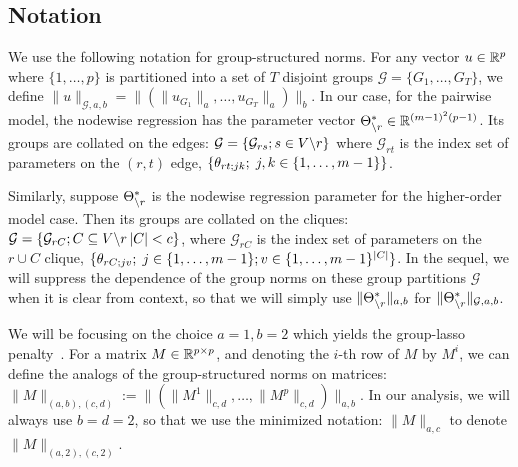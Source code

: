 \subsection{Notation}

We use the following notation for group-structured norms. For any vector $u \in \mathbb{R}^p$ where $\{1,\hdots,p\}$ is partitioned into a set of $T$ disjoint groups $\mathcal{G} = \{G_1,\hdots,G_T\}$, we define $\|u\|_{\mathcal{G},a,b} = \|(\|u_{G_1}\|_{a},\hdots, u_{G_T}\|_{a})\|_b$. In our case, for the pairwise model, the nodewise regression has the parameter vector $\Theta^*_{\backslash r} \in \mathbb{R}^{(m-1)^2(p-1)}$. Its groups are collated on the edges:  $\mathcal{G} = \{ \mathcal{G}_{rs}; s \in  V \backslash r\}$ where $\mathcal{G}_{rt}$ is the index set of parameters on the  $(r,t)$ edge, $\{\theta_{rt;jk} ;\; j,k \in \{1,\hdots,m - 1\}\}$.

Similarly, suppose $\Theta^*_{\backslash r}$ is the nodewise regression parameter for the higher-order model case. Then its groups are collated on the cliques: $\mathcal{G} = \{ \mathcal{G}_{rC}; C \subseteq  V \backslash r\, |C| < c\}$, where $\mathcal{G}_{rC}$ is the index set of parameters on the  ${r} \cup C$ clique, $\{\theta_{rC;jv} ;\; j \in \{1,\hdots,m - 1\}; v \in \{1,\hdots,m - 1\}^{|C|}\}$. In the sequel, we will suppress the dependence of the group norms on these group partitions $\mathcal{G}$ when it is clear from context, so that we will simply use 
$\|\Theta^*_{\backslash r}\|_{a,b}$ for $\|\Theta^*_{\backslash r}\|_{\mathcal{G},a,b}$.

We will be focusing on the choice $a = 1, b = 2$ which yields the group-lasso penalty~\citep{YuaLi06}. For a matrix $M \in \mathbb{R}^{p \times p}$, and denoting the $i$-th row of $M$ by $M^i$, 
we can define the analogs of the group-structured norms on matrices: $\|M\|_{(a,b),(c,d)} := \|(\|M^{1}\|_{c,d},\hdots, \|M^{p}\|_{c,d})\|_{a,b}$. In our analysis, we will always use $b = d = 2$, so that we use the minimized notation: $\|M\|_{a,c}$ to denote $\|M\|_{(a,2),(c,2)}$.




